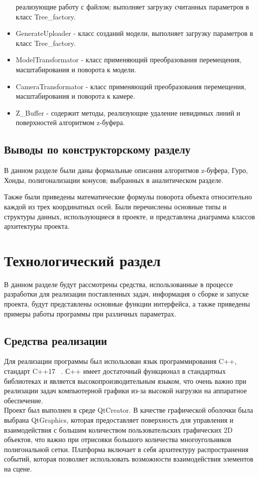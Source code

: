 \documentclass[54pt, a4paper]{article}
\begin{document}
\begin{itemize}
		реализующие работу с файлом; выполняет загрузку считанных параметров в класс Tree\_factory.
		\item GenerateUploader - класс созданий модели, выполняет загрузку параметров в класс Tree\_factory.
		\item ModelTransformator - класс применяющий преобразования перемещения, масштабирования и поворота к модели.
		\item CameraTransformator - класс применяющий преобразования перемещения, масштабирования и поворота к камере.
		\item Z\_Buffer - содержит методы, реализующие удаление невидимых
		линий и поверхностей алгоритмом z-буфера.
	\end{itemize}

	\subsection{Выводы по конструкторскому разделу}
	В данном разделе были даны формальные описания алгоритмов z-буфера, Гуро, Хонды, полигонализации конусов; выбранных в аналитическом разделе. 
	
	Также были приведены математические формулы поворота объекта относительно каждой из трех координатных осей. Были перечислены основные типы и
	структуры данных, использующиеся в проекте, и представлена диаграмма классов архитектуры проекта.

	\newpage
	\section {Технологический раздел}
	В данном разделе будут рассмотрены средства, использованные в процессе
	разработки для реализации поставленных задач, информация о сборке и запуске проекта, будут представлены основные функции интерфейса, а также приведены
	примеры работы программы при различных параметрах.
	\subsection {Средства реализации}
	Для реализации программы был использован язык программирования C++, стандарт C++17 ~\cite{C}. С++ имеет достаточный функционал в стандартных библиотеках и является высокопроизводительным языком, что очень важно при реализации задач компьютерной графики из-за высокой нагрузки на аппаратное обеспечение.\\
	
	Проект был выполнен в среде QtCreator\cite{Qt}. В качестве графической оболочки была выбрана QtGraphics, которая предоставляет поверхность для управления и взаимодействия с большим количеством пользовательских графических 2D объектов, что важно при отрисовки большого количества многоугольников полигональной сетки. Платформа включает в себя архитектуру распространения событий, которая позволяет использовать возможности взаимодействия элементов на сцене.
\end{document}
